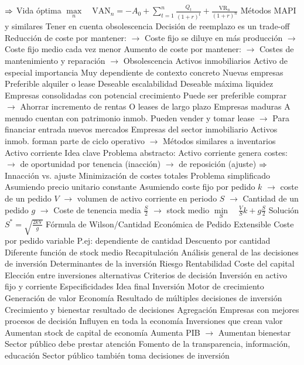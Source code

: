 \documentclass{nuevotema}
\begin{document}
\begin{esquemal}
				\4[] $\then$ Vida óptima
				\4[] $\underset{n}{\max} \quad \text{VAN}_n = -A_0 + \sum_{t=1}^n \frac{Q_t}{(1+r)^t} +  \frac{\text{VR}_n}{(1+r)^n}$
				\4 Métodos MAPI y similares
				\4[] Tener en cuenta obsolescencia
				\4[] Decisión de reemplazo es un trade-off
				\4[] Reducción de coste por mantener:
				\4[] $\to$ Coste fijo se diluye en más producción
				\4[] $\to$ Coste fijo medio cada vez menor
				\4[] Aumento de coste por mantener:
				\4[] $\to$ Costes de mantenimiento y reparación
				\4[] $\to$ Obsolescencia
			\3 Activos inmobiliarios
				\4 Activo de especial importancia
				\4[] Muy dependiente de contexto concreto
				\4 Nuevas empresas
				\4[] Preferible alquiler o lease
				\4[] Deseable escalabilidad
				\4[] Deseable máxima liquidez
				\4 Empresas consolidadas con potencial crecimiento
				\4[] Puede ser preferible comprar
				\4[] $\to$ Ahorrar incremento de rentas
				\4[] O leases de largo plazo
				\4 Empresas maduras
				\4[] A menudo cuentan con patrimonio inmob.
				\4[] Pueden vender y tomar lease
				\4[] $\to$ Para financiar entrada nuevos mercados
				\4 Empresas del sector inmobiliario
				\4[] Activos inmob. forman parte de ciclo operativo
				\4[] $\to$ Métodos similares a inventarios
		\2 Activo corriente
			\3 Idea clave
				\4 Problema abstracto:
				\4[] Activo corriente genera costes:
				\4[] $\to$ de oportunidad por tenencia (inacción)
				\4[] $\to$ de reposición (ajuste)
				\4[] $\then$ Innacción vs. ajuste
			\3 Minimización de costes totales
				\4 Problema simplificado
				\4[] Asumiendo precio unitario constante
				\4[] Asumiendo coste fijo por pedido
				\4[] $k$ $\to$ coste de un pedido
				\4[] $V$ $\to$ volumen de activo corriente en periodo
				\4[] $S$ $\to$ Cantidad de un pedido
				\4[] $g$ $\to$ Coste de tenencia media
				\4[] $\frac{S}{2}$ $\to$ stock medio
				\4[] $\underset{S}{\min} \quad \frac{V}{S}k + g \frac{S}{2}$
				\4 Solución
				\4[] $S^* = \sqrt{\frac{2kV}{g}}$
				\4[$\to$] Fórmula de Wilson/Cantidad Económica de Pedido
			\3 Extensible
				\4 Coste por pedido variable
				\4[] P.ej: dependiente de cantidad
				\4 Descuento por cantidad
				\4 Diferente función de stock medio
	\1[] 
		\2 Recapitulación
			\3 Análisis general de las decisiones de inversión
			\3 Determinantes de la inversión
				\4 Riesgo
				\4 Rentabilidad
				\4 Coste del capital
			\3 Elección entre inversiones alternativas
				\4 Criterios de decisión
			\3 Inversión en activo fijo y corriente
				\4 Especificidades
		\2 Idea final
			\3 Inversión
				\4 Motor de crecimiento
				\4 Generación de valor
			\3 Economía
				\4 Resultado de múltiples decisiones de inversión
				\4 Crecimiento y bienestar resultado de decisiones
			\3 Agregación
				\4 Empresas con mejores procesos de decisión
				\4[] Influyen en toda la economía
				\4 Inversiones que crean valor
				\4[] Aumentan stock de capital de economía
				\4[] Aumenta PIB
				\4[] $\to$ Aumentan bienestar
				\4[$\then$] Sector público debe prestar atención
				\4[$\then$] Fomento de la transparencia, información, educación
				\4[$\then$] Sector público también toma decisiones de inversión
\end{esquemal}
\end{document}
